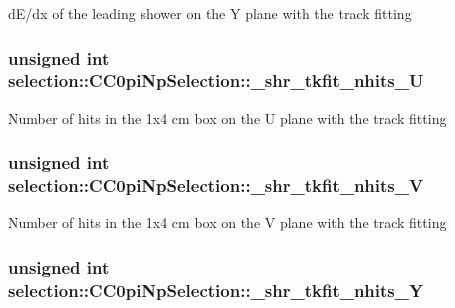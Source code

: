 d\-E/dx of the leading shower on the Y plane with the track fitting \hypertarget{classselection_1_1CC0piNpSelection_a6c75f5783174133ce97849f128f3dee3}{
\subsubsection[{\-\_\-shr\-\_\-tkfit\-\_\-nhits\-\_\-\-U}]{\setlength{\rightskip}{0pt plus 5cm}unsigned int selection\-::\-C\-C0pi\-Np\-Selection\-::\-\_\-shr\-\_\-tkfit\-\_\-nhits\-\_\-\-U\hspace{0.3cm}{\ttfamily [private]}}}\label{classselection_1_1CC0piNpSelection_a6c75f5783174133ce97849f128f3dee3}
Number of hits in the 1x4 cm box on the U plane with the track fitting \hypertarget{classselection_1_1CC0piNpSelection_adab23c54dd799cdf83c31a10e4ae9061}{
\subsubsection[{\-\_\-shr\-\_\-tkfit\-\_\-nhits\-\_\-\-V}]{\setlength{\rightskip}{0pt plus 5cm}unsigned int selection\-::\-C\-C0pi\-Np\-Selection\-::\-\_\-shr\-\_\-tkfit\-\_\-nhits\-\_\-\-V\hspace{0.3cm}{\ttfamily [private]}}}\label{classselection_1_1CC0piNpSelection_adab23c54dd799cdf83c31a10e4ae9061}
Number of hits in the 1x4 cm box on the V plane with the track fitting \hypertarget{classselection_1_1CC0piNpSelection_ae3a53326b19594013c9df08b66ccaa73}{
\subsubsection[{\-\_\-shr\-\_\-tkfit\-\_\-nhits\-\_\-\-Y}]{\setlength{\rightskip}{0pt plus 5cm}unsigned int selection\-::\-C\-C0pi\-Np\-Selection\-::\-\_\-shr\-\_\-tkfit\-\_\-nhits\-\_\-\-Y\hspace{0.3cm}{\ttfamily [private]}}}\label{classselection_1_1CC0piNpSelection_ae3a53326b19594013c9df08b66ccaa73}

